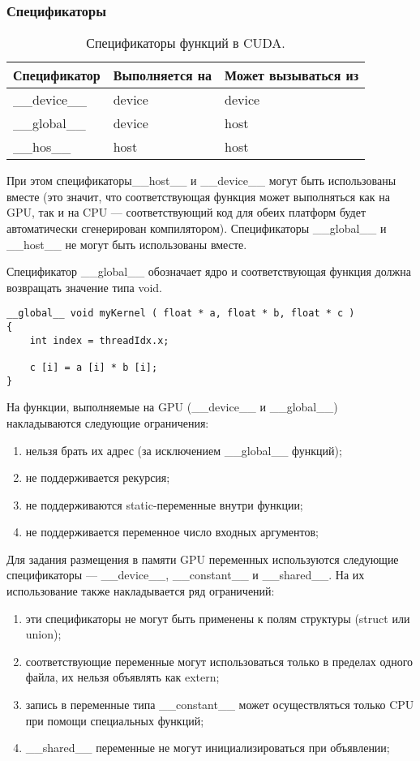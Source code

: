 \subsubsection{Спецификаторы}

\begin{table}[h]
\caption{\label{cudatypes} Спецификаторы функций в CUDA.}
\begin{center}
\begin{tabular}{|l|l|l|}
\hline
Спецификатор	&Выполняется на	&Может вызываться из \\
\hline
\_\_device\_\_	&device	&device\\
\hline
\_\_global\_\_	&device	&host\\
\hline
\_\_hos\_\_	&host	&host\\
\hline
\end{tabular}
\end{center}
\end{table} 

При этом спецификаторы\_\_host\_\_ и \_\_device\_\_ могут быть использованы вместе (это значит, что соответствующая функция может выполняться как на GPU, так и на CPU --- соответствующий код для обеих платформ будет автоматически сгенерирован компилятором). Спецификаторы \_\_global\_\_ и \_\_host\_\_ не могут быть использованы вместе.

Спецификатор \_\_global\_\_ обозначает ядро и соответствующая функция должна возвращать значение типа void.

\begin{verbatim}
__global__ void myKernel ( float * a, float * b, float * c )
{
    int index = threadIdx.x;
	
    c [i] = a [i] * b [i];
}
\end{verbatim}

На функции, выполняемые на GPU (\_\_device\_\_ и \_\_global\_\_) накладываются следующие ограничения:
\begin{enumerate}
\item нельзя брать их адрес (за исключением \_\_global\_\_ функций);
\item не поддерживается рекурсия;
\item не поддерживаются static-переменные внутри функции;
\item не поддерживается переменное число входных аргументов;
\end{enumerate}

Для задания размещения в памяти GPU переменных используются следующие спецификаторы --- \_\_device\_\_, \_\_constant\_\_ и \_\_shared\_\_. На их использование также накладывается ряд ограничений:
\begin{enumerate}
\item эти спецификаторы не могут быть применены к полям структуры (struct или union);
\item соответствующие переменные могут использоваться только в пределах одного файла, их нельзя объявлять как extern;
\item запись в переменные типа \_\_constant\_\_ может осуществляться только CPU при помощи специальных функций;
\item \_\_shared\_\_ переменные не могут инициализироваться при объявлении;
\end{enumerate}

